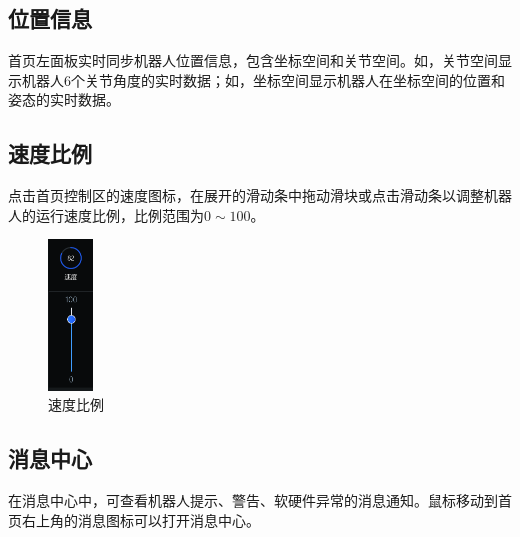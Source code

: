 \vspace*{-2em}

\subsection{位置信息}
\LM 首页左面板实时同步机器人位置信息，包含坐标空间和关节空间。如，关节空间显示机器人6个关节角度的实时数据；如，坐标空间显示机器人在坐标空间的位置和姿态的实时数据。

\subsection{速度比例}
点击\LM 首页控制区的速度图标，在展开的滑动条中拖动滑块或点击滑动条以调整机器人的运行速度比例，比例范围为$0\sim 100$。

\begin{figure}[ht]
	\centering
	\includegraphics[height=4cm]{screen/2-13.png}
	\caption{速度比例}
	\label{fig:速度比例}
\end{figure}

\subsection{消息中心}
在消息中心中，可查看机器人提示、警告、软硬件异常的消息通知。鼠标移动到\LM 首页右上角的消息图标\colorbox{black}{}可以打开消息中心。


